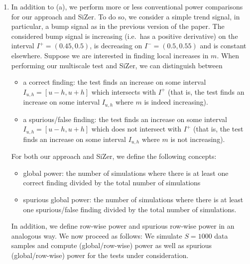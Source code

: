 \documentclass[a4paper,12pt]{article}
\begin{document}
\begin{enumerate}[label=(\arabic*),leftmargin=0.7cm]
\begin{enumerate}[label=(\alph*), leftmargin=0.7cm]
\item In addition to (a), we perform more or less conventional power comparisons for our approach and SiZer. To do so, we consider a simple trend signal, in particular, a bump signal as in the previous version of the paper. The considered bump signal is increasing (i.e.\ has a positive derivative) on the interval $I^+ = (0.45,0.5)$, is decreasing on $I^- = (0.5,0.55)$ and is constant elsewhere. Suppose we are interested in finding local increases in $m$. When performing our multiscale test and SiZer, we can distinguish between 
\begin{itemize}[leftmargin=0.5cm,itemsep=0cm]
\item a correct finding: the test finds an increase on some interval $I_{u,h} = [u-h,u+h]$ which intersects with $I^+$ (that is, the test finds an increase on some interval $I_{u,h}$ where $m$ is indeed increasing).
\item a spurious/false finding: the test finds an increase on some interval $I_{u,h} = [u-h,u+h]$ which does not intersect with $I^+$ (that is, the test finds an increase on some interval $I_{u,h}$ where $m$ is not increasing).
\end{itemize}
For both our approach and SiZer, we define the following concepts: 
\begin{itemize}[leftmargin=0.5cm,itemsep=0cm]
\item global power: the number of simulations where there is at least one correct finding divided by the total number of simulations
\item spurious global power: the number of simulations where there is at least one spurious/false finding divided by the total number of simulations.
\end{itemize}
In addition, we define row-wise power and spurious row-wise power in an ana\-logous way. We now proceed as follows: We simulate $S=1000$ data samples and compute (global/row-wise) power as well as spurious (global/row-wise) power for the tests under consideration.  


\end{enumerate}
\end{enumerate}
\end{document}
